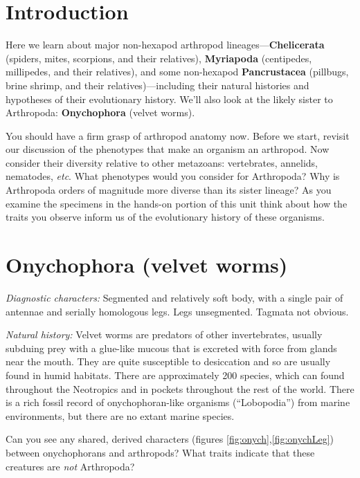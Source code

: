 \section{Introduction}
Here we learn about major non-hexapod arthropod lineages---\textbf{Chelicerata} (spiders, mites, scorpions, and their relatives), \textbf{Myriapoda} (centipedes, millipedes, and their relatives), and some non-hexapod \textbf{Pancrustacea} (pillbugs, brine shrimp, and their relatives)---including their natural histories and hypotheses of their evolutionary history. We'll also look at the likely sister to Arthropoda: \textbf{Onychophora} (velvet worms).

You should have a firm grasp of arthropod anatomy now. Before we start, revisit our discussion of the phenotypes that make an organism an arthropod. Now consider their diversity relative to other metazoans: vertebrates, annelids, nematodes, \textit{etc}. What phenotypes would you consider  for Arthropoda? Why is Arthropoda orders of magnitude more diverse than its sister lineage? As you examine the specimens in the hands-on portion of this unit think about how the traits you observe inform us of the evolutionary history of these organisms.

\section{Onychophora (velvet worms)}
\noindent{}\textit{Diagnostic characters:} Segmented and relatively soft body, with a single pair of antennae and serially homologous legs. Legs unsegmented. Tagmata not obvious.\vspace{3mm}

\noindent{}\textit{Natural history:} Velvet worms are predators of other invertebrates, usually subduing prey with a glue-like mucous that is excreted with force from glands near the mouth. They are quite susceptible to desiccation and so are usually found in humid habitats. There are approximately 200 species, which can found throughout the Neotropics and in pockets throughout the rest of the world. There is a rich fossil record of onychophoran-like organisms (``Lobopodia'') from marine environments, but there are no extant marine species.\vspace{3mm}

\begin{theo}[Onychophora]
{}Can you see any shared, derived characters (figures \ref{fig:onych},\ref{fig:onychLeg}) between onychophorans and arthropods? What traits indicate that these creatures are  \textit{not} Arthropoda?
\end{theo}

